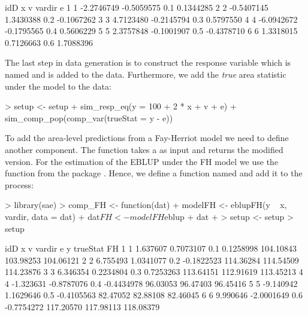 \documentclass[article]{ajs}
\begin{document}
\begin{Schunk}
\begin{Soutput}
  idD          x          v vardir          e
1   1 -2.2746749 -0.5059575    0.1  0.1344285
2   2 -0.5407145  1.3430388    0.2 -0.1067262
3   3  4.7123480 -0.2145794    0.3  0.5797550
4   4 -6.0942672 -0.1795565    0.4  0.5606229
5   5  2.3757848 -0.1001907    0.5 -0.4378710
6   6  1.3318015  0.7126663    0.6  1.7088396
\end{Soutput}
\end{Schunk}

The last step in data generation is to construct the response variable which is named  and is added to the data. Furthermore, we add the \textit{true} area statistic under the model to the data:

\begin{Schunk}
\begin{Sinput}
> setup <- setup %
+   sim_resp_eq(y = 100 + 2 * x + v + e) %
+   sim_comp_pop(comp_var(trueStat = y - e))
\end{Sinput}
\end{Schunk}

To add the area-level predictions from a Fay-Herriot model we need to define another component. The function takes a  as input and returns the modified version. For the estimation of the EBLUP under the FH model we use the function  from the package  \citep{molina13}. Hence, we define a function named  and add it to the process:

\begin{Schunk}
\begin{Sinput}
> library(sae)
> comp_FH <- function(dat) {
+   modelFH <- eblupFH(y ~ x, vardir, data = dat)
+   dat$FH <- modelFH$eblup
+   dat
+ }
> setup <- setup %
> setup
\end{Sinput}
\begin{Soutput}
  idD         x          v vardir          e         y  trueStat        FH
1   1  1.637607  0.7073107    0.1  0.1258998 104.10843 103.98253 104.06121
2   2  6.755493  1.0341077    0.2 -0.1822523 114.36284 114.54509 114.23876
3   3  6.346354  0.2234804    0.3  0.7253263 113.64151 112.91619 113.45213
4   4 -1.323631 -0.8787076    0.4 -0.4434978  96.03053  96.47403  96.45416
5   5 -9.140942  1.1629646    0.5 -0.4105563  82.47052  82.88108  82.46045
6   6  9.990646 -2.0001649    0.6 -0.7754272 117.20570 117.98113 118.08379
\end{Soutput}
\end{Schunk}
\end{document}
